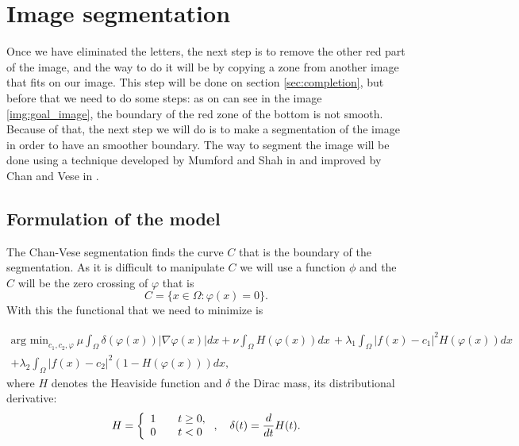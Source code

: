 \documentclass[10pt,a4paper]{llncs}
\begin{document}
\section{Image segmentation}\label{sec:segmentation}
Once we have eliminated the letters, the next step is to remove the other red part of the image, and the way to do it will be by copying a zone from another image that fits on our image. This step will be done on section \ref{sec:completion}, but before that we need to do some steps: as on can see in the image \ref{img:goal_image}, the boundary of the red zone of the bottom is not smooth. Because of that, the next step we will do is to make a segmentation of the image in order to have an smoother boundary. The way to segment the image will be done using a technique developed by Mumford and Shah in \cite{mumford1989optimal} and improved by Chan and Vese in \cite{chan2001active}. 
\subsection{Formulation of the model}
The Chan-Vese segmentation finds the curve $C$ that is the boundary of the segmentation. As it is difficult to manipulate $C$ we will use a function $\phi$ and the $C$ will be the zero crossing of $\varphi$ that is 
\begin{equation}
C = \{x\in \Omega:\varphi(x) = 0\}.
\end{equation}
With this the functional that we need to minimize is

\begin{equation}
\begin{split}
\text{arg min}_{c_1, c_2, \varphi}\ \mu \int_{\Omega}\delta(\varphi(x))|\nabla\varphi(x)|dx+\nu \int_{\Omega}H(\varphi(x))dx\, + \lambda_1\int_{\Omega}|f(x)-c_1|^2H(\varphi(x))dx \\+ \lambda_2\int_{\Omega}|f(x) -c_2|^2(1-H(\varphi(x)))dx,
\end{split}
\label{eq:segment_functional}
\end{equation}
where $H$ denotes the Heaviside function and $\delta$ the Dirac mass, its distributional derivative:
\begin{equation}
H = \left\lbrace\begin{array}{l l}
1&\quad t\geq 0,\\
0 &\quad  t<0
\end{array}\right. ,\quad \delta(t) = \frac{d}{dt}H(t).
\label{eq:segment_Heaviside}
\end{equation}
\end{document}
